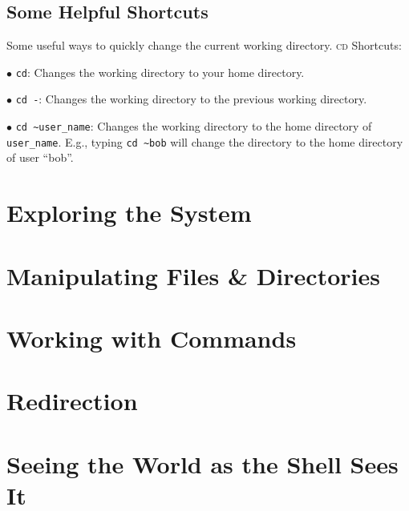 \documentclass[oneside]{book}
\numberwithin{equation}{section}
\begin{document}
\subsection{Some Helpful Shortcuts}
Some useful ways to quickly change the current working directory. \textsc{cd} Shortcuts:
\begin{enumerate*}
	\item[$\bullet$] \texttt{cd}: Changes the working directory to your home directory.
	\item[$\bullet$] \texttt{cd -}: Changes the working directory to the previous working directory.
	\item[$\bullet$] \verb|cd ~user_name|: Changes the working directory to the home directory of \verb|user_name|. E.g., typing \verb|cd ~bob| will change the directory to the home directory of user ``bob''.
\end{enumerate*}


\section{Exploring the System}


\section{Manipulating Files \& Directories}


\section{Working with Commands}


\section{Redirection}


\section{Seeing the World as the Shell Sees It}
\end{document}
